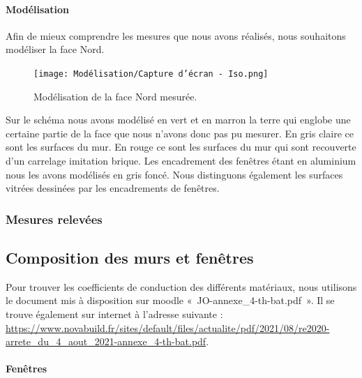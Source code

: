 \documentclass[12pt, a4paper]{article}
\begin{document}
\paragraph{Modélisation\\}
Afin de mieux comprendre les mesures que nous avons réalisés, nous souhaitons modéliser la face Nord. 

\begin{figure}[htb!]
 \centering
 \texttt{[image: Modélisation/Capture d'écran - Iso.png]}
 \caption{Modélisation de la face Nord mesurée.}
 \label{Capture d'écran - Iso}
\end{figure}

Sur le schéma nous avons modélisé en vert et en marron la terre qui englobe une certaine partie de la face que nous n'avons donc pas pu mesurer. En gris claire ce sont les surfaces du mur. En rouge ce sont les surfaces du mur qui sont recouverte d'un carrelage imitation brique. Les encadrement des fenêtres étant en aluminium nous les avons modélisés en gris foncé. Nous distinguons également les surfaces vitrées dessinées par les encadrements de fenêtres. 


\subsubsection{Mesures relevées}
























\subsection{Composition des murs et fenêtres}

Pour trouver les coefficients de conduction des différents matériaux, nous utilisons le document mis à disposition sur moodle «~JO-annexe\_4-th-bat.pdf~». Il se trouve également sur internet à l'adresse suivante : \url{https://www.novabuild.fr/sites/default/files/actualite/pdf/2021/08/re2020-arrete_du_4_aout_2021-annexe_4-th-bat.pdf}.

\paragraph{Fenêtres} \phantom{.} \\
\end{document}
